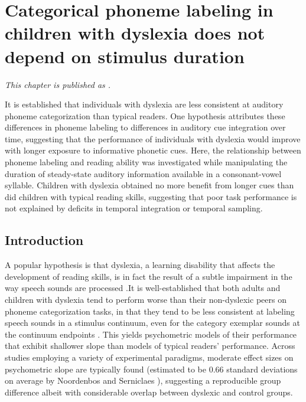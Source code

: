 \documentclass[../uwthesis.tex]{subfiles}
\begin{document}
\chapter{Categorical phoneme labeling in children with dyslexia does not depend on stimulus duration}
\emph{This chapter is published as \citep{OBrien2019CategoricalDuration}.}


It is established that individuals with dyslexia are less consistent at auditory phoneme categorization than typical readers. One hypothesis attributes these differences in phoneme labeling to differences in auditory cue integration over time, suggesting that the performance of individuals with dyslexia would improve with longer exposure to informative phonetic cues. Here, the relationship between phoneme labeling and reading ability was investigated while manipulating the duration of steady-state auditory information available in a consonant-vowel syllable. Children with dyslexia obtained no more benefit from longer cues than did children with typical reading skills, suggesting that poor task performance is not explained by deficits in temporal integration or temporal sampling.

\section{Introduction}
A popular hypothesis is that dyslexia, a learning disability that affects the development of reading skills, is in fact the result of a subtle impairment in the way speech sounds are processed \citep{Farmer1995,VanIngelghem2005,Poelmans2011,Tallal1980}.It is well-established that both adults and children with dyslexia tend to perform worse than their non-dyslexic peers on phoneme categorization tasks, in that they tend to be less consistent at labeling speech sounds in a stimulus continuum, even for the category exemplar sounds at the continuum endpoints \citep{Brandt1980,Hakvoort2016,OBrien2018,Serniclaes2004,Zhang2012}. This yields psychometric models of their performance that exhibit shallower slope than models of typical readers' performance. Across studies employing a variety of experimental paradigms, moderate effect sizes on psychometric slope are typically found (estimated to be 0.66 standard deviations on average by Noordenbos and Serniclaes \citep{Noordenbos2015}), suggesting a reproducible group difference albeit with considerable overlap between dyslexic and control groups.
\end{document}
